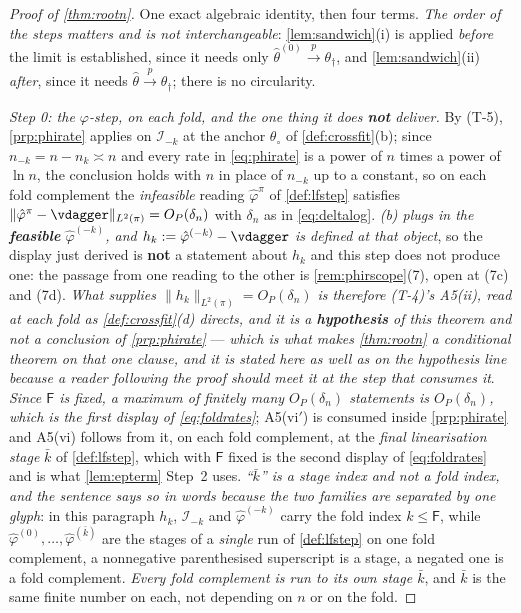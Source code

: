 \begin{proof}[Proof of \cref{thm:rootn}]
One exact algebraic identity, then four terms. \emph{The order of the steps matters and is not
interchangeable}: \cref{lem:sandwich}(i) is applied \emph{before} the limit is established, since it needs
only $\hat\theta^{(0)}\xrightarrow{p}\theta_\dagger$, and \cref{lem:sandwich}(ii) \emph{after}, since it
needs $\hat\theta\xrightarrow{p}\theta_\dagger$; there is no circularity.

\emph{Step 0: the $\varphi$-step, on each fold, and the one thing it does \textbf{not} deliver.} By (T-5), \cref{prp:phirate} applies on $\mathcal I_{-k}$ at
the anchor $\theta_\circ$ of \cref{def:crossfit}(b); since $n_{-k}=n-n_k\asymp n$ and every rate in
\eqref{eq:phirate} is a power of $n$ times a power of $\ln n$, the conclusion holds with $n$ in place of
$n_{-k}$ up to a constant, so on each fold complement the \emph{infeasible} reading $\hat\varphi^{\pi}$
of \cref{def:lfstep} satisfies $\|\hat\varphi^{\pi}-\vdagger\|_{L^{2}(\pi)}=O_P(\delta_n)$ with
$\delta_n$ as in \eqref{eq:deltalog}.
\emph{\textup{(b)} plugs in the \textbf{feasible} $\hat\varphi^{(-k)}$, and
$h_k:=\hat\varphi^{(-k)}-\vdagger$ is defined at that object}, so the display just derived is
\textbf{not} a statement about $h_k$ and this step does not produce one: the passage from one reading to
the other is \cref{rem:phirscope}\textup{(7)}, open at \textup{(7c)} and \textup{(7d)}.
\emph{What supplies $\|h_k\|_{L^{2}(\pi)}=O_P(\delta_n)$ is therefore \textup{(T-4)}'s A5(ii), read at
each fold as \cref{def:crossfit}\textup{(d)} directs, and it is a \textbf{hypothesis} of this theorem and
not a conclusion of \cref{prp:phirate}} --- \emph{which is what makes \cref{thm:rootn} a conditional
theorem on that one clause, and it is stated here as well as on the hypothesis line because a reader
following the proof should meet it at the step that consumes it}. \emph{Since $\mathsf F$ is fixed, a maximum of finitely many $O_P(\delta_n)$
statements is $O_P(\delta_n)$, which is the first display of \eqref{eq:foldrates}}; A5(vi$'$) is consumed
inside \cref{prp:phirate} and A5(vi) follows from it, on each fold complement, at the \emph{final
linearisation stage} $\bar k$ of \cref{def:lfstep}, which with
$\mathsf F$ fixed is the second display of \eqref{eq:foldrates} and is what \cref{lem:epterm} Step~2 uses.
\emph{``$\bar k$'' is a stage index and not a fold index, and the sentence says so in words because the two
families are separated by one glyph}: in this paragraph $h_k$, $\mathcal I_{-k}$ and $\hat\varphi^{(-k)}$
carry the fold index $k\le\mathsf F$, while $\hat\varphi^{(0)},\dots,\hat\varphi^{(\bar k)}$ are the stages
of a \emph{single} run of \cref{def:lfstep} on one fold complement, a nonnegative parenthesised
superscript is a stage, a negated one is a fold complement. \emph{Every fold complement is run to its own
stage $\bar k$}, and $\bar k$ is the same finite number on each, not depending on $n$ or on the fold.


\end{proof}

